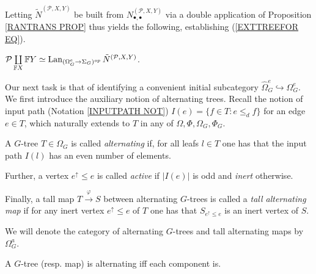\documentclass[a4paper,10pt]{article}%
\begin{document}
Letting 
$\tilde{N}^{(\mathcal P, X,Y)}$
be built from
$N_{\bullet,\bullet}^{(\mathcal P, X,Y)}$
via a double application of Proposition \ref{RANTRANS PROP}  thus yields the following, establishing 
(\ref{EXTTREEFOR EQ}).

\begin{corollary}
	$\mathcal P \coprod\limits_{\mathbb F X} \mathbb F Y \simeq \operatorname{Lan}_{(\Omega_G^e \to \Sigma_G)^{op}}\tilde N^{(\mathcal P, X,Y)}$.
\end{corollary}

Our next task is that of identifying a convenient initial subcategory $\widehat{\Omega}_G^{e} \hookrightarrow \Omega_G^e$.
We first introduce the auxiliary notion of alternating trees.
Recall the notion of input path (Notation \ref{INPUTPATH NOT})
$I(e) = \{f \in T \colon e \leq_d f\}$ for an edge $e \in T$, which naturally extends to $T$ in any of $\Omega, \Phi, \Omega_G, \Phi_G$.


\begin{definition}\label{OMEGAA DEF}
A $G$-tree $T \in \Omega_G$ is called \textit{alternating} if, for all leafs $l \in T$ one has that the input path $I(l)$ has an even number of elements.

Further, a vertex $e^{\uparrow} \leq e$ is called \textit{active}
if $|I(e)|$ is odd and \textit{inert} otherwise.

Finally, a tall map $T \xrightarrow{\varphi} S$ between alternating $G$-trees is called a 
\textit{tall alternating map}
if for any inert vertex $e^{\uparrow} \leq e$ of $T$ one has that 
$S_{e^{\uparrow} \leq e}$ is an inert vertex of $S$.

We will denote the category of alternating $G$-trees and tall alternating maps by $\Omega_G^a$.
\end{definition}

\begin{remark}
	A $G$-tree (resp. map) is alternating
	iff each component is.
\end{remark}
\end{document}
